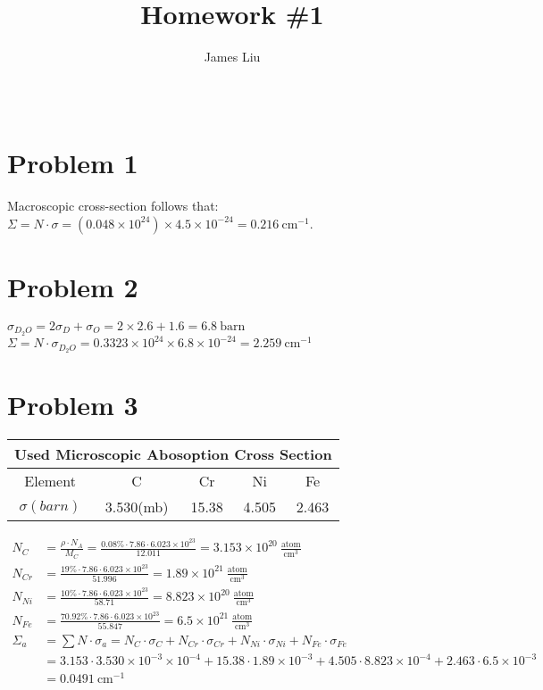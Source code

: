 \documentclass{article}
\title{\textbf{Homework \#1 }}
\author{James Liu}
\date{\ }
\begin{document}
\maketitle

\section*{Problem 1}
    Macroscopic cross-section follows that:\\
    \(\Sigma = N\cdot \sigma= 
    (0.048\times 10^{24}) \times  4.5 \times 10^{-24}
    = 0.216\ \text{cm}^{-1}\).
\section*{Problem 2}
    \(\displaystyle{\sigma_{D_2O}=2\sigma_D+\sigma_O=2\times 2.6+1.6=6.8\ \text{barn}}\)\\
    \(\Sigma = N\cdot \sigma_{D_2O}=0.3323\times 10^{24}\times 6.8\times 10^{-24}=2.259\ \text{cm}^{-1}\)
\section*{Problem 3}
    \begin{table}[h]
        \centering
        \begin{tabular}{c c c c c}
            \multicolumn{5}{c}{Used Microscopic Abosoption Cross Section}\\ \hline \hline
            Element&C&Cr&Ni&Fe\\\hline
            $\sigma(barn)$ &3.530(mb)&15.38&4.505&2.463\\ \hline
        \end{tabular}
    \end{table}

    \begin{align*}
    N_C &=\displaystyle{\frac {\rho \cdot N_A}{M_C}=\frac{0.08\% \cdot 7.86 \cdot 6.023\times 10^{23}}{12.011}=3.153\times 10^{20}\ \frac {\text{atom}}{\text{cm}^{3}}}\\
    N_{Cr}&=\displaystyle{\frac{19\% \cdot 7.86 \cdot 6.023\times 10^{23}}{51.996}=1.89\times 10^{21}}\ \frac {\text{atom}}{\text{cm}^{3}}\\
    N_{Ni}&=\displaystyle{\frac{10\% \cdot 7.86 \cdot 6.023\times 10^{23}}{58.71}=8.823\times 10^{20}}\ \frac {\text{atom}}{\text{cm}^{3}}\\
    N_{Fe}&=\displaystyle{\frac{70.92\% \cdot 7.86 \cdot 6.023\times 10^{23}}{55.847}=6.5\times 10^{21}}\ \frac {\text{atom}}{\text{cm}^{3}}\\
        \Sigma_a    &= \displaystyle {\sum N\cdot \sigma_a}=N_{C}\cdot \sigma_{C}+N_{Cr}\cdot \sigma_{Cr}+N_{Ni}\cdot \sigma_{Ni}+N_{Fe}\cdot \sigma_{Fe}\\
                    &=3.153\cdot 3.530\times 10^{-3} \times 10^{-4}+15.38\cdot 1.89\times 10^{-3}+4.505\cdot 8.823\times 10^{-4}+2.463\cdot 6.5\times 10^{-3}\\
                    &=0.0491 \ \text{cm}^{-1}                    
    \end{align*}
\end{document}
